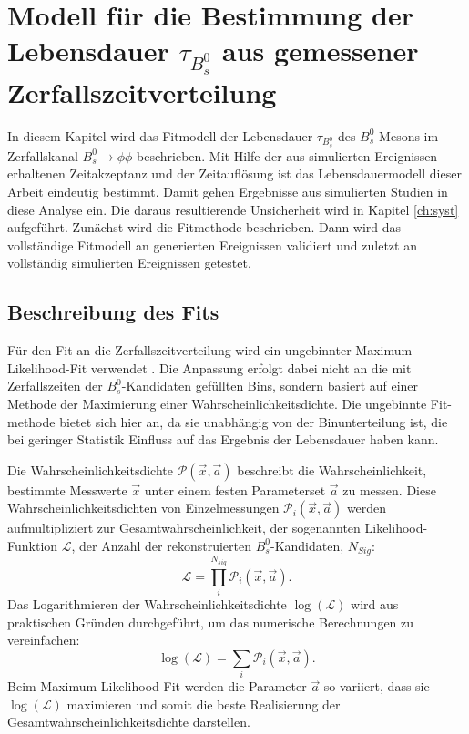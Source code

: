 \documentclass{article}
\begin{document}
\section{Modell für die Bestimmung der Lebensdauer $\tau_{B_s^0}$ aus gemessener Zerfallszeitverteilung}
In diesem Kapitel wird das Fitmodell der Lebensdauer $\tau_{B_s^0}$ des $B_s^0$-Mesons im Zerfallskanal $B_s^0\rightarrow \phi \phi$ beschrieben. Mit Hilfe der aus simulierten Ereignissen erhaltenen Zeitakzeptanz und der Zeitauflösung ist das Lebensdauermodell dieser Arbeit eindeutig bestimmt. Damit gehen Ergebnisse aus simulierten Studien in diese Analyse ein. Die daraus resultierende Unsicherheit wird in Kapitel \ref{ch:syst} aufgeführt. 
Zunächst wird die Fitmethode beschrieben. Dann wird das vollständige Fitmodell an generierten Ereignissen validiert und zuletzt an vollständig simulierten Ereignissen getestet.

\subsection{Beschreibung des Fits}
\label{ch:fitb}%
Für den Fit an die Zerfallszeitverteilung wird ein ungebinnter Maximum-Likelihood-Fit verwendet \cite{maxil}. Die Anpassung erfolgt dabei nicht an die mit Zerfallszeiten der $B_s^0$-Kandidaten gefüllten Bins, sondern basiert auf einer Methode der Maximierung einer Wahrscheinlichkeitsdichte. Die ungebinnte Fit-methode bietet sich hier an, da sie unabhängig von der Binunterteilung ist, die bei geringer Statistik Einfluss auf das Ergebnis der Lebensdauer haben kann.

Die Wahrscheinlichkeitsdichte $\mathcal{P}(\vec{x},\vec{a})$ beschreibt die Wahrscheinlichkeit, bestimmte Messwerte $\vec{x}$ unter einem festen Parameterset $\vec{a}$ zu messen. Diese Wahrscheinlichkeitsdichten von Einzelmessungen $\mathcal{P}_i(\vec{x},\vec{a})$ werden aufmultipliziert zur Gesamtwahrscheinlichkeit, der sogenannten Likelihood-Funktion $\mathcal{L}$, der Anzahl der rekonstruierten $B_s^0$-Kandidaten, $N_{Sig}$:
\[\mathcal{L}=\prod_i^{N_{sig}} \mathcal{P}_i(\vec{x},\vec{a}).\] %
Das Logarithmieren der Wahrscheinlichkeitsdichte $\log(\mathcal{L})$ wird aus praktischen Gründen durchgeführt, um das numerische Berechnungen zu vereinfachen:
\[\log(\mathcal{L})=\sum_i \mathcal{P}_i(\vec{x},\vec{a}).\]
Beim Maximum-Likelihood-Fit werden die Parameter $\vec{a}$ so variiert, dass sie $\log(\mathcal{L})$ maximieren und somit die beste Realisierung der Gesamtwahrscheinlichkeitsdichte darstellen.
\end{document}
